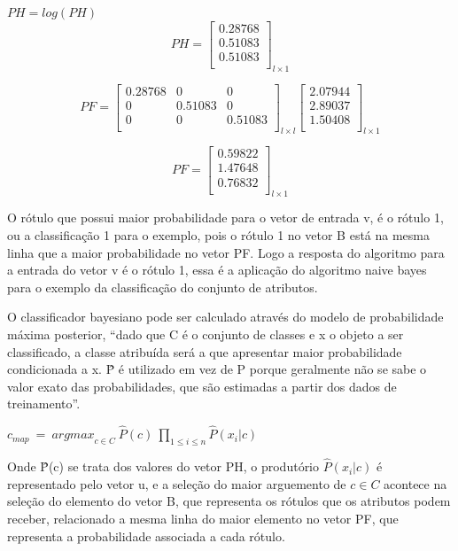 \begin{center}
$PH = log(PH)$
$$PH=\left[
\begin{array}{c}
0.28768 \\
0.51083 \\
0.51083 \\
\end{array}
\right]_{l \times 1}$$
\end{center}

$$PF=\left[
\begin{array}{ccccc}
0.28768 & 0 & 0 \\
0 & 0.51083 & 0 \\
0 & 0 & 0.51083 \\
\end{array}
\right]_{l \times l}
\left[
\begin{array}{c}
2.07944 \\
2.89037 \\
1.50408 \\
\end{array}
\right]_{l \times 1}
$$

$$PF=\left[
\begin{array}{c}
0.59822 \\
1.47648 \\
0.76832 \\
\end{array}
\right]_{l \times 1}
$$

O rótulo que possui maior probabilidade para o vetor de entrada v, é o
rótulo 1, ou a classificação 1 para o exemplo, pois o rótulo 1 no vetor
B está na mesma linha que a maior probabilidade no vetor PF. Logo a resposta
do algoritmo para a entrada do vetor v é o rótulo 1, essa é a aplicação
do algoritmo naive bayes para o exemplo da classificação do conjunto de
atributos.

O classificador bayesiano pode ser calculado através do modelo de probabilidade
máxima posterior, ``dado que C é o conjunto de classes e x o objeto a ser
classificado, a classe atribuída será a que apresentar maior probabilidade
condicionada a x. {\^P} é utilizado em vez de P porque geralmente não se sabe
o valor exato das probabilidades, que são estimadas a partir dos dados de
treinamento''.

\begin{center}
$ c_{map} \ = \ {arg max}_{c \in C} \ \hat{P}(c) \ \prod\limits_{1 \leq i \leq n} \hat{P}(x_i | c)  $
\\
\end{center}

Onde {\^P}(c) se trata dos valores do vetor PH, o produtório $\hat{P}(x_i | c)$
é representado pelo vetor u, e a seleção do maior arguemento de ${c \in C}$
acontece na seleção do elemento do vetor B, que representa os rótulos que os
atributos podem receber, relacionado a mesma linha do maior elemento no vetor PF,
que representa a probabilidade associada a cada rótulo.
